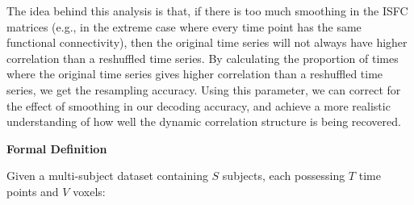 \documentclass[11pt]{article}
\begin{document}
The idea behind this analysis is that, if there is too much smoothing in the ISFC matrices (e.g., in the extreme case where every time point has the same functional connectivity), then the original time series will not always have higher correlation than a reshuffled time series. By calculating the proportion of times where the original time series gives higher correlation than a reshuffled time series, we get the resampling accuracy.  Using this parameter, we can correct for the effect of smoothing in our decoding accuracy, and achieve a more realistic understanding of how well the dynamic correlation structure is being recovered.

\large{\textbf{Formal Definition}}

\normalsize
Given a multi-subject dataset containing $S$ subjects, each possessing $T$ time points and $V$ voxels:
\end{document}
